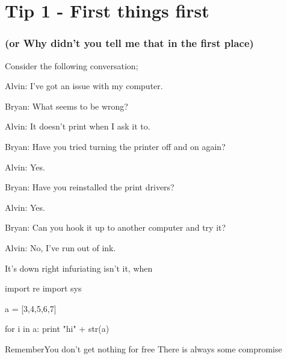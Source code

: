 \chapter{Tip 1 - First things first}
\subsection{(or Why didn't you tell me that in the first place)}

Consider the following conversation;

\begin{trenches}
Alvin: I've got an issue with my computer.

Bryan: What seems to be wrong?

Alvin: It doesn't print when I ask it to.

Bryan: Have you tried turning the printer off and on again?

Alvin: Yes.

Bryan: Have you reinstalled the print drivers?

Alvin: Yes.

Bryan: Can you hook it up to another computer and try it?

Alvin: No, I've run out of ink.
\end{trenches}

It's down right infuriating isn't it, when

\begin{code}
import re
import sys

a = [3,4,5,6,7]

for i in a:
	print "hi" + str(a)
\end{code}

\begin{callout}{Remember}{You don't get nothing for free}
There is always some compromise
\end{callout}
